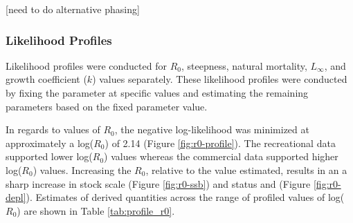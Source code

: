 \documentclass[11pt,
  english,
  a4paper,
]{article}
\begin{document}
\leavevmode\tagmcend\tagstructend\par


{[}need to do alternative phasing{]}

\leavevmode\tagmcend\tagstructend\par


\hypertarget{likelihood-profiles}{%
\subsubsection{Likelihood Profiles}\label{likelihood-profiles}}

\leavevmode\tagmcend\tagstructend


Likelihood profiles were conducted for {\(R_0\)\leavevmode\tagmcend\tagstructend}, steepness, natural mortality, {\(L_{\infty}\)\leavevmode\tagmcend\tagstructend}, and growth coefficient ({\(k\)\leavevmode\tagmcend\tagstructend}) values separately. These likelihood profiles were conducted by fixing the parameter at specific values and estimating the remaining parameters based on the fixed parameter value.

\leavevmode\tagmcend\tagstructend\par


In regards to values of {\(R_0\)\leavevmode\tagmcend\tagstructend}, the negative log-likelihood was minimized at approximately a log({\(R_0\)\leavevmode\tagmcend\tagstructend}) of 2.14 (Figure \ref{fig:r0-profile}). The recreational data supported lower log({\(R_0\)\leavevmode\tagmcend\tagstructend}) values whereas the commercial data supported higher log({\(R_0\)\leavevmode\tagmcend\tagstructend}) values. Increasing the {\(R_0\)\leavevmode\tagmcend\tagstructend}, relative to the value estimated, results in an a sharp increase in stock scale (Figure \ref{fig:r0-ssb}) and status and (Figure \ref{fig:r0-depl}). Estimates of derived quantities across the range of profiled values of log({\(R_0\)\leavevmode\tagmcend\tagstructend}) are shown in Table \ref{tab:profile_r0}.
\end{document}
